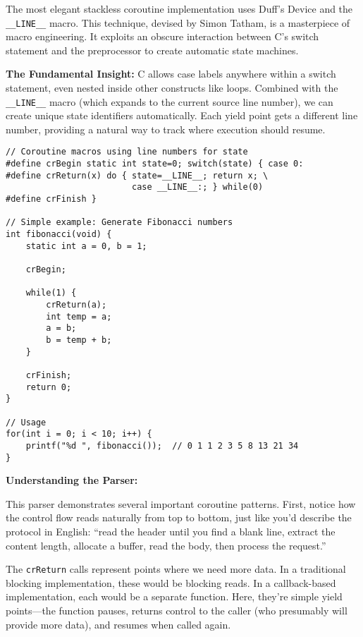 The most elegant stackless coroutine implementation uses Duff's Device and the \texttt{\_\_LINE\_\_} macro. This technique, devised by Simon Tatham, is a masterpiece of macro engineering. It exploits an obscure interaction between C's switch statement and the preprocessor to create automatic state machines.

\textbf{The Fundamental Insight:} C allows case labels anywhere within a switch statement, even nested inside other constructs like loops. Combined with the \texttt{\_\_LINE\_\_} macro (which expands to the current source line number), we can create unique state identifiers automatically. Each yield point gets a different line number, providing a natural way to track where execution should resume.

\begin{lstlisting}
// Coroutine macros using line numbers for state
#define crBegin static int state=0; switch(state) { case 0:
#define crReturn(x) do { state=__LINE__; return x; \
                         case __LINE__:; } while(0)
#define crFinish }

// Simple example: Generate Fibonacci numbers
int fibonacci(void) {
    static int a = 0, b = 1;

    crBegin;

    while(1) {
        crReturn(a);
        int temp = a;
        a = b;
        b = temp + b;
    }

    crFinish;
    return 0;
}

// Usage
for(int i = 0; i < 10; i++) {
    printf("%d ", fibonacci());  // 0 1 1 2 3 5 8 13 21 34
}
\end{lstlisting}

\vspace{0.3cm}
\noindent\textbf{Understanding the Parser:}

This parser demonstrates several important coroutine patterns. First, notice how the control flow reads naturally from top to bottom, just like you'd describe the protocol in English: ``read the header until you find a blank line, extract the content length, allocate a buffer, read the body, then process the request.''

The \texttt{crReturn} calls represent points where we need more data. In a traditional blocking implementation, these would be blocking reads. In a callback-based implementation, each would be a separate function. Here, they're simple yield points---the function pauses, returns control to the caller (who presumably will provide more data), and resumes when called again.

